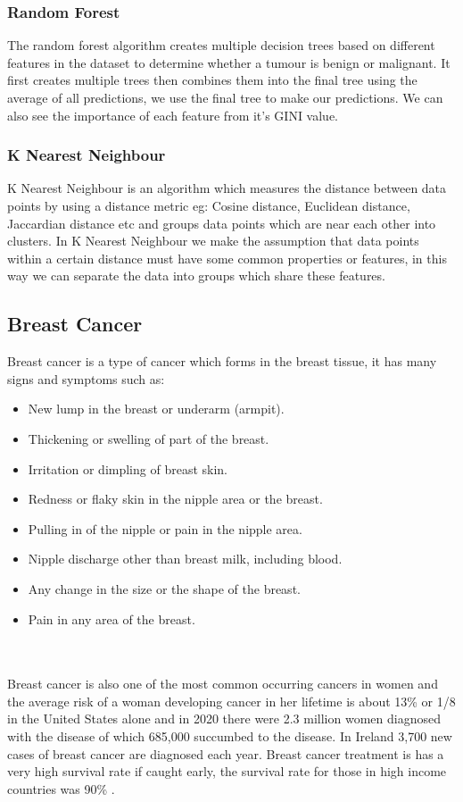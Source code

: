 \documentclass[conference]{IEEEtran}
\begin{document}
\subsubsection{Random Forest}
The random forest algorithm creates multiple decision trees based on different features in the dataset to determine whether a tumour is benign or malignant.  It first creates multiple trees then combines them into the final tree using the average of all predictions, we use the final tree to make our predictions.  We can also see the importance of each feature from it's GINI value.
\subsubsection{K Nearest Neighbour}
K Nearest Neighbour is an algorithm which measures the distance between data points by using a distance metric eg: Cosine distance, Euclidean distance, Jaccardian distance etc and groups data points which are near each other into clusters.  In K Nearest Neighbour we make the assumption that data points within a certain distance must have some common properties or features, in this way we can separate the data into groups which share these features.

\subsection{Breast Cancer}
Breast cancer is a type of cancer which forms in the breast tissue, it has many signs and symptoms such as: 
\begin{itemize}
    \item New lump in the breast or underarm (armpit).
    \item Thickening or swelling of part of the breast.
    \item Irritation or dimpling of breast skin.
    \item Redness or flaky skin in the nipple area or the breast.
    \item Pulling in of the nipple or pain in the nipple area.
    \item Nipple discharge other than breast milk, including blood.
    \item Any change in the size or the shape of the breast.
    \item Pain in any area of the breast.
\end{itemize} \cite{symptomsofbreastcancer}
\\
\\
Breast cancer is also one of the most common occurring cancers in women and the average risk of a woman developing cancer in her lifetime is about 13\% or 1/8 in the United States alone\cite{howcommonisbreastcancer} and in 2020 there were 2.3 million women diagnosed with the disease of which 685,000 succumbed to the disease\cite{breastcancerstatistics}. In Ireland 3,700 new cases of breast cancer are diagnosed each year\cite{breastcancerireland}. Breast cancer treatment is has a very high survival rate if caught early, the survival rate for those in high income countries was 90\% \cite{breastcancerstatistics}.
\end{document}
